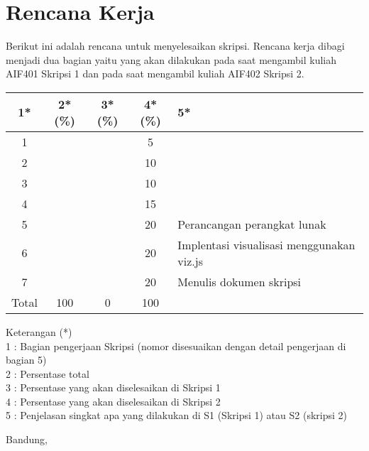 \documentclass[a4paper,twoside]{article}
\begin{document}
\section{Rencana Kerja}
Berikut ini adalah rencana untuk menyelesaikan skripsi. Rencana kerja dibagi menjadi dua bagian yaitu
yang akan dilakukan pada saat mengambil kuliah AIF401 Skripsi 1 dan pada saat mengambil kuliah AIF402
Skripsi 2.

\begin{center}
  \begin{tabular}{ | c | c | c | c | l |}
    \hline
    1*  & 2*(\%) & 3*(\%) & 4*(\%) &5*\\ \hline \hline
    1   &   &   & 5 &  \\ \hline
    2   &   &   & 10 &  \\ \hline
    3   &   &   & 10 &  \\ \hline
    4   &   &   & 15 &  \\ \hline
    5   &   &   & 20 & {\footnotesize Perancangan perangkat lunak} \\ \hline
    6   &  &    & 20 & {\footnotesize Implentasi visualisasi menggunakan viz.js}\\ \hline
    7   &   &   & 20 & {\footnotesize Menulis dokumen skripsi} \\ \hline
    
    Total  & 100  & 0  & 100 &  \\ \hline
                          \end{tabular}
\end{center}

Keterangan (*)\\
1 : Bagian pengerjaan Skripsi (nomor disesuaikan dengan detail pengerjaan di bagian 5)\\
2 : Persentase total \\
3 : Persentase yang akan diselesaikan di Skripsi 1 \\
4 : Persentase yang akan diselesaikan di Skripsi 2 \\
5 : Penjelasan singkat apa yang dilakukan di S1 (Skripsi 1) atau S2 (skripsi 2)

\vspace{1cm}
\centering Bandung, \tanggal\\
\vspace{2cm} \nama \\ 
\vspace{1cm}
\end{document}

